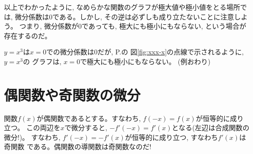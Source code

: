 以上でわかったように, なめらかな関数のグラフが極大値や極小値をとる場所では, 
微分係数は0である。しかし, その逆は必ずしも成り立たないことに注意しよう。
つまり, 微分係数が0であっても, 極大にも極小にもならない, という場合が
存在するのだ。\mv

\begin{exmpl}
$y=x^3$は$x=0$での微分係数は0だが, P.\pageref{fig:xxx-x}の
図\ref{fig:xxx-x}の点線で示されるように, $y=x^3$の
グラフは, $x=0$で極大にも極小にもならない。
(例おわり)\end{exmpl}
\vv




\section{偶関数や奇関数の微分}

関数$f(x)$が偶関数であるとする。すなわち, $f(-x)=f(x)$が恒等的に成り立つ。
この両辺を$x$で微分すると, $-f'(-x)=f'(x)$となる(左辺は合成関数の微分!)。
すなわち, $f'(-x)=-f'(x)$が恒等的に成り立つ, すなわち$f'(x)$は奇関数
である。偶関数の導関数は奇関数なのだ!

